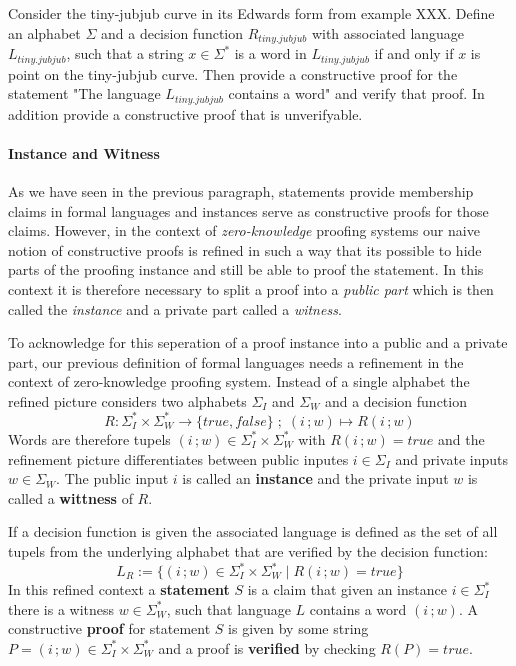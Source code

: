 \begin{exercise} Consider the tiny-jubjub curve in its Edwards form from example XXX. Define an alphabet $\Sigma$ and a decision function $R_{tiny.jubjub}$ with associated language $L_{tiny.jubjub}$, such that a string $x\in \Sigma^*$ is a word in $L_{tiny.jubjub}$ if and only if $x$ is point on the tiny-jubjub curve. Then provide a constructive proof for the statement "The language $L_{tiny.jubjub}$ contains a word" and verify that proof. In addition provide a constructive proof that is unverifyable.
\end{exercise}
\paragraph{Instance and Witness}
As we have seen in the previous paragraph, statements provide membership claims in formal languages and instances serve as constructive proofs for those claims. However, in the context of \textit{zero-knowledge} proofing systems our naive notion of constructive proofs is refined in such a way that  its possible to hide parts of the proofing instance and still be able to proof the statement. In this context it is therefore necessary to split a proof into a \textit{public part} which is then called the \textit{instance} and a private part called a \textit{witness}.

To acknowledge for this seperation of a proof instance into a public and a private part, our previous definition of formal languages needs a refinement in the context of zero-knowledge proofing system. Instead of a single alphabet the refined picture considers two alphabets $\Sigma_I$ and $\Sigma_W$ and a decision function 
\begin{equation}
R: \Sigma_I^* \times \Sigma_W^* \to \{true, false\}\;;\; (i\,;w) \mapsto R(i\,;w)
\end{equation}
Words are therefore tupels $(i\,;w)\in \Sigma_I^* \times \Sigma_W^*$ with $R(i\,;w)=true$ and the refinement picture differentiates between public inputes $i\in \Sigma_I$ and private inputs $w\in \Sigma_W$. The public input $i$ is called an \textbf{instance} and the private input $w$ is called a \textbf{wittness} of $R$. 

If a decision function is given the associated language is defined as the set of all tupels from the underlying alphabet that are verified by the decision function:
\begin{equation}
L_R := \{(i\,;w)\in \Sigma_I^* \times \Sigma_W^* \;|\; R(i\,;w)=true\}
\end{equation}
In this refined context a \textbf{statement} $S$ is a claim that given an instance $i\in\Sigma_I^*$ there is a witness $w\in \Sigma_W^*$, such that language $L$ contains a word $(i\,;w)$. A constructive \textbf{proof} for statement $S$ is given by some string $P=(i\,; w) \in \Sigma_I^* \times \Sigma_W^*$ and a proof is \textbf{verified} by checking $R(P)=true$. 

